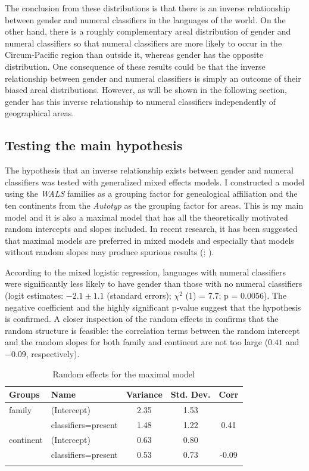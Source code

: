 \documentclass[output=collectionpaper]{langsci/langscibook}
\begin{document}
The conclusion from these distributions is that there is an inverse relationship between gender and numeral classifiers in the languages of the world. On the other hand, there is a roughly complementary areal distribution of gender and numeral classifiers so that numeral classifiers are more likely to occur in the Circum-Pacific region than outside it, whereas gender has the opposite distribution. One consequence of these results could be that the inverse relationship between gender and numeral classifiers is simply an outcome of their biased areal distributions. However, as will be shown in the following section, gender has this inverse relationship to numeral classifiers independently of geographical areas.


\subsection{Testing the main hypothesis}
\label{sec:Sinne:4.2}

The hypothesis that an inverse relationship exists between gender and numeral classifiers was tested with generalized mixed effects models. I constructed a model using the \textit{WALS} families as a grouping factor for genealogical affiliation and the ten continents from the \textit{Autotyp} as the grouping factor for areas. This is my main model and it is also a maximal model that has all the theoretically motivated random intercepts and slopes included. In recent research, it has been suggested that maximal models are preferred in mixed models and especially that models without random slopes may produce spurious results (\citealt{Schielzeth2009}; \citealt{Barr2013}).

According to the mixed logistic regression, languages with numeral classifiers were significantly less likely to have gender than those with no numeral classifiers (logit estimates: $-2.1 \pm 1.1$ (standard errors); $\chi^2$ (1) = 7.7; p = 0.0056). The negative coefficient and the highly significant p-value suggest that the hypothesis is confirmed. A closer inspection of the random effects in  confirms that the random structure is feasible: the correlation terms between the random intercept and the random slopes for both family and continent are not too large ($0.41$ and $-0.09$, respectively).

\begin{table}[htb]
\begin{tabularx}{\textwidth}{XX *{3}{S[table-format=+1.2]}}
\lsptoprule
 Groups &  Name &  {Variance} &  {Std. Dev.} &  {Corr}\\
\midrule
family    & (Intercept) & 2.35 & 1.53\\
          & classifiers=present      & 1.48 & 1.22 & 0.41\\
continent & (Intercept) & 0.63 & 0.80\\
          & classifiers=present      & 0.53 & 0.73 & -0.09\\
\lspbottomrule
\end{tabularx}
\caption{Random effects for the maximal model}
\label{tab:Sinne:3}
\end{table}
\end{document}
